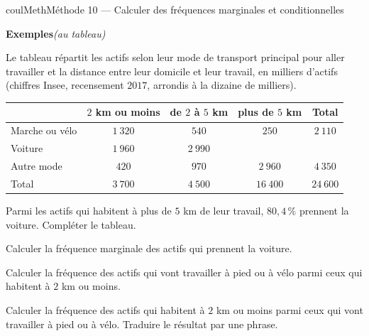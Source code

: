 \documentclass[11pt,a4paper]{article}
\makeatletter
\newcounter{lycee@signet}
\newcommand{\signet}[3][]{\stepcounter{lycee@signet}%
  \edef\lycee@dest{\if\relax\detokenize{#1}\relax
    signet.\arabic{lycee@signet}\else#1\fi}%
  \hypertarget{\lycee@dest}{}\bookmark[level=#2,dest=\lycee@dest]{#3}}
\newcounter{methode}
\newenvironment{methodebox}[1][Méthode]{\stepcounter{methode}%
  \begin{boitecours}[phantom={\signet[methode-\arabic{methode}]{2}{#1}}]{coulMeth}{#1}}%
  {\end{boitecours}}
\newcommand{\autableau}{\hfill{\footnotesize\itshape\color{black!45}(au tableau)}}
\newcommand{\etapeexemples}{%
    \par\smallskip\textbf{\color{coulMeth}Exemples}\autableau\par\nobreak\smallskip}
\makeatother
\begin{document}
\begin{methodebox}[Méthode 10 --- Calculer des fréquences marginales et conditionnelles]
\etapeexemples
Le tableau répartit les actifs selon leur mode de transport principal pour aller
travailler et la distance entre leur domicile et leur travail, en milliers d'actifs
(chiffres Insee, recensement $2017$, arrondis à la dizaine de milliers).
\begin{center}
\renewcommand{\arraystretch}{1.5}
\begin{tabular}{|l|c|c|c|c|}
\hline
 & $2$ km ou moins & de $2$ à $5$ km & plus de $5$ km & Total\\\hline
Marche ou vélo & $1~320$ & $540$ & $250$ & $2~110$\\\hline
Voiture & $1~960$ & $2~990$ & & \\\hline
Autre mode & $420$ & $970$ & $2~960$ & $4~350$\\\hline
Total & $3~700$ & $4~500$ & $16~400$ & $24~600$\\\hline
\end{tabular}
\end{center}
\begin{questions}[label=\alph*)]
  \item Parmi les actifs qui habitent à plus de $5$ km de leur travail, $80{,}4\,\%$
    prennent la voiture. Compléter le tableau.
  \item Calculer la fréquence marginale des actifs qui prennent la voiture.
  \item Calculer la fréquence des actifs qui vont travailler à pied ou à vélo parmi
    ceux qui habitent à $2$ km ou moins.
  \item Calculer la fréquence des actifs qui habitent à $2$ km ou moins parmi ceux qui
    vont travailler à pied ou à vélo. Traduire le résultat par une phrase.
\end{questions}


\end{methodebox}
\end{document}
